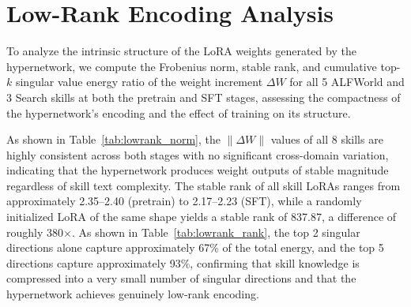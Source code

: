 \section{Low-Rank Encoding Analysis}
\label{app:lowrank}
 
To analyze the intrinsic structure of the LoRA weights generated by the hypernetwork, we compute the Frobenius norm, stable rank, and cumulative top-$k$ singular value energy ratio of the weight increment $\Delta W$ for all 5 ALFWorld and 3 Search skills at both the pretrain and SFT stages, assessing the compactness of the hypernetwork's encoding and the effect of training on its structure.
 
As shown in Table~\ref{tab:lowrank_norm}, the $\|\Delta W\|$ values of all 8 skills are highly consistent across both stages with no significant cross-domain variation, indicating that the hypernetwork produces weight outputs of stable magnitude regardless of skill text complexity. The stable rank of all skill LoRAs ranges from approximately 2.35--2.40 (pretrain) to 2.17--2.23 (SFT), while a randomly initialized LoRA of the same shape yields a stable rank of 837.87, a difference of roughly 380$\times$. As shown in Table~\ref{tab:lowrank_rank}, the top 2 singular directions alone capture approximately 67\% of the total energy, and the top 5 directions capture approximately 93\%, confirming that skill knowledge is compressed into a very small number of singular directions and that the hypernetwork achieves genuinely low-rank encoding.
 

